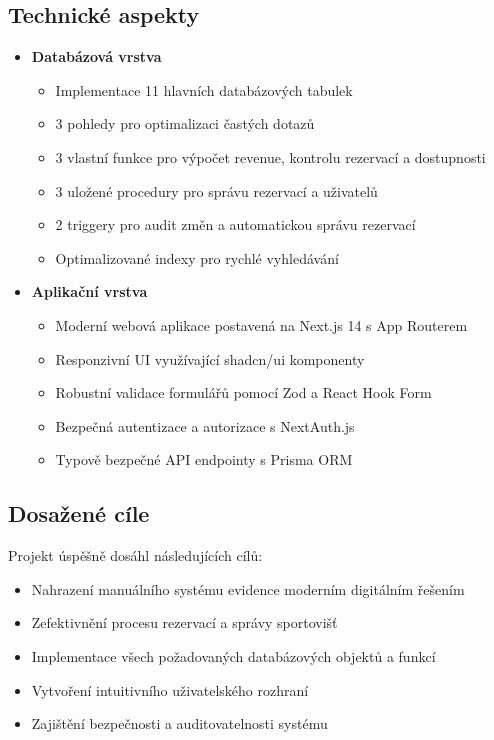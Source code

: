 \documentclass[12pt, a4paper]{article}
\begin{document}
\subsection{Technické aspekty}
\begin{itemize}
    \item \textbf{Databázová vrstva}
    \begin{itemize}
        \item Implementace 11 hlavních databázových tabulek
        \item 3 pohledy pro optimalizaci častých dotazů
        \item 3 vlastní funkce pro výpočet revenue, kontrolu rezervací a dostupnosti
        \item 3 uložené procedury pro správu rezervací a uživatelů
        \item 2 triggery pro audit změn a automatickou správu rezervací
        \item Optimalizované indexy pro rychlé vyhledávání
    \end{itemize}
    
    \item \textbf{Aplikační vrstva}
    \begin{itemize}
        \item Moderní webová aplikace postavená na Next.js 14 s App Routerem
        \item Responzivní UI využívající shadcn/ui komponenty
        \item Robustní validace formulářů pomocí Zod a React Hook Form
        \item Bezpečná autentizace a autorizace s NextAuth.js
        \item Typově bezpečné API endpointy s Prisma ORM
    \end{itemize}
\end{itemize}

\subsection{Dosažené cíle}
Projekt úspěšně dosáhl následujících cílů:
\begin{itemize}
    \item Nahrazení manuálního systému evidence moderním digitálním řešením
    \item Zefektivnění procesu rezervací a správy sportovišť
    \item Implementace všech požadovaných databázových objektů a funkcí
    \item Vytvoření intuitivního uživatelského rozhraní
    \item Zajištění bezpečnosti a auditovatelnosti systému
\end{itemize}
\end{document}
